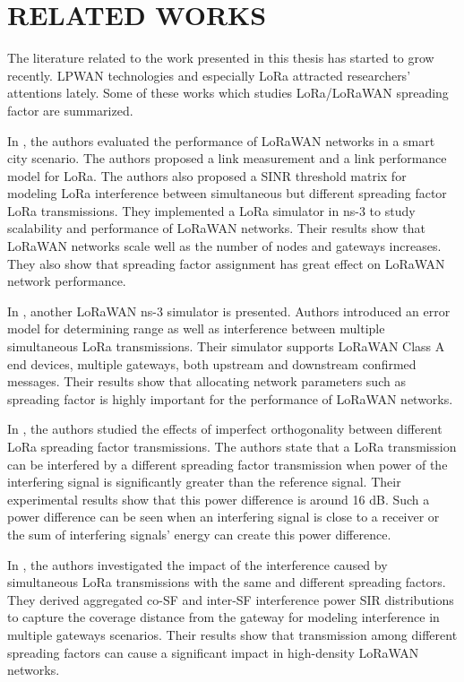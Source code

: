 \chapter{RELATED WORKS}\label{ch:related_works}

The literature related to the work presented in this thesis has started to grow recently. LPWAN technologies and especially LoRa attracted researchers’ attentions lately. Some of these works which studies LoRa/LoRaWAN spreading factor are summarized.

In \cite{7996384}, the authors evaluated the performance of LoRaWAN networks in a smart city scenario. The authors proposed a link measurement and a link performance model for LoRa. The authors also proposed a SINR threshold matrix for modeling LoRa interference between simultaneous but different spreading factor LoRa transmissions. They implemented a LoRa simulator in ns-3 to study scalability and performance of LoRaWAN networks. Their results show that LoRaWAN networks scale well as the number of nodes and gateways increases. They also show that spreading factor assignment has great effect on LoRaWAN network performance.

In \cite{8090518}, another LoRaWAN ns-3 simulator is presented. Authors introduced an error model for determining range as well as interference between multiple simultaneous LoRa transmissions. Their simulator supports LoRaWAN Class A end devices, multiple gateways, both upstream and downstream confirmed messages. Their results show that allocating network parameters such as spreading factor is highly important for the performance of LoRaWAN networks.

In \cite{8267219}, the authors studied the effects of imperfect orthogonality between different LoRa spreading factor transmissions. The authors state that a LoRa transmission can be interfered by a different spreading factor transmission when power of the interfering signal is significantly greater than the reference signal. Their experimental results show that this power difference is around 16 dB. Such a power difference can be seen when an interfering signal is close to a receiver or the sum of interfering signals' energy can create this power difference.

In \cite{8430542}, the authors investigated the impact of the interference caused by simultaneous LoRa transmissions with the same and different spreading factors. They derived aggregated co-SF and inter-SF interference power SIR distributions to capture the coverage distance from the gateway for modeling interference in multiple gateways scenarios. Their results show that transmission among different spreading factors can cause a significant impact in high-density LoRaWAN networks.

